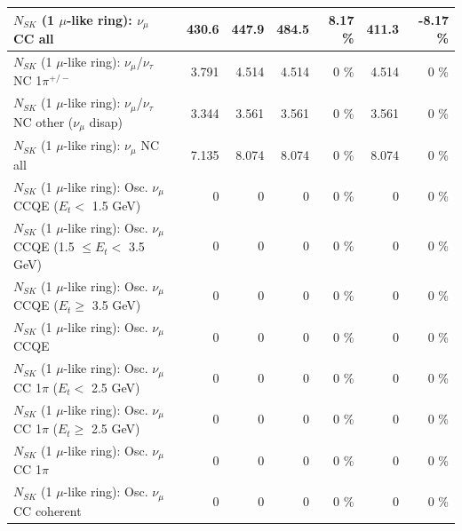 \begin{table}
\begin{tabular}{| l | r | r | r  r | r  r |}
                                $N_{SK}$ (1 $\mu$-like ring): $\nu_{\mu}$ CC all &           430.6 &           447.9 &           484.5 &     8.17 \%  &           411.3 &    -8.17 \%  \\ 
\hline
              $N_{SK}$ (1 $\mu$-like ring): $\nu_\mu$/$\nu_\tau$ NC 1$\pi^{+/-}$ &           3.791 &           4.514 &           4.514 &        0 \%  &           4.514 &        0 \%  \\ 
   $N_{SK}$ (1 $\mu$-like ring): $\nu_\mu$/$\nu_\tau$ NC other ($\nu_\mu$ disap) &           3.344 &           3.561 &           3.561 &        0 \%  &           3.561 &        0 \%  \\ 
                                $N_{SK}$ (1 $\mu$-like ring): $\nu_{\mu}$ NC all &           7.135 &           8.074 &           8.074 &        0 \%  &           8.074 &        0 \%  \\ 
\hline
\hline
           $N_{SK}$ (1 $\mu$-like ring): Osc. $\nu_\mu$ CCQE ($E_{t} <$ 1.5 GeV) &               0 &               0 &               0 &        0 \%  &               0 &        0 \%  \\ 
  $N_{SK}$ (1 $\mu$-like ring): Osc. $\nu_\mu$ CCQE (1.5 $\leq E_{t} <$ 3.5 GeV) &               0 &               0 &               0 &        0 \%  &               0 &        0 \%  \\ 
        $N_{SK}$ (1 $\mu$-like ring): Osc. $\nu_\mu$ CCQE ($E_{t} \geq$ 3.5 GeV) &               0 &               0 &               0 &        0 \%  &               0 &        0 \%  \\ 
\hline
                               $N_{SK}$ (1 $\mu$-like ring): Osc. $\nu_\mu$ CCQE &               0 &               0 &               0 &        0 \%  &               0 &        0 \%  \\ 
\hline
      $N_{SK}$ (1 $\mu$-like ring): Osc. $\nu_\mu$ CC 1$\pi$ ($E_{t} <$ 2.5 GeV) &               0 &               0 &               0 &        0 \%  &               0 &        0 \%  \\ 
   $N_{SK}$ (1 $\mu$-like ring): Osc. $\nu_\mu$ CC 1$\pi$ ($E_{t} \geq$ 2.5 GeV) &               0 &               0 &               0 &        0 \%  &               0 &        0 \%  \\ 
\hline
                          $N_{SK}$ (1 $\mu$-like ring): Osc. $\nu_\mu$ CC 1$\pi$ &               0 &               0 &               0 &        0 \%  &               0 &        0 \%  \\ 
                        $N_{SK}$ (1 $\mu$-like ring): Osc. $\nu_\mu$ CC coherent &               0 &               0 &               0 &        0 \%  &               0 &        0 \%  \\ 

\end{tabular}
\end{table}
